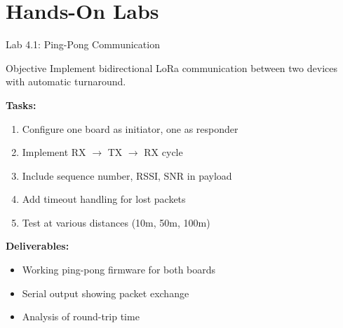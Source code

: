 \documentclass{beamer}
\begin{document}
\section{Hands-On Labs}

\begin{frame}{Lab 4.1: Ping-Pong Communication}
\begin{block}{Objective}
Implement bidirectional LoRa communication between two devices with automatic turnaround.
\end{block}

\textbf{Tasks:}
\begin{enumerate}
    \item Configure one board as initiator, one as responder
    \item Implement RX $\rightarrow$ TX $\rightarrow$ RX cycle
    \item Include sequence number, RSSI, SNR in payload
    \item Add timeout handling for lost packets
    \item Test at various distances (10m, 50m, 100m)
\end{enumerate}

\vspace{0.3cm}

\textbf{Deliverables:}
\begin{itemize}
    \item Working ping-pong firmware for both boards
    \item Serial output showing packet exchange
    \item Analysis of round-trip time
\end{itemize}
\end{frame}
\end{document}
